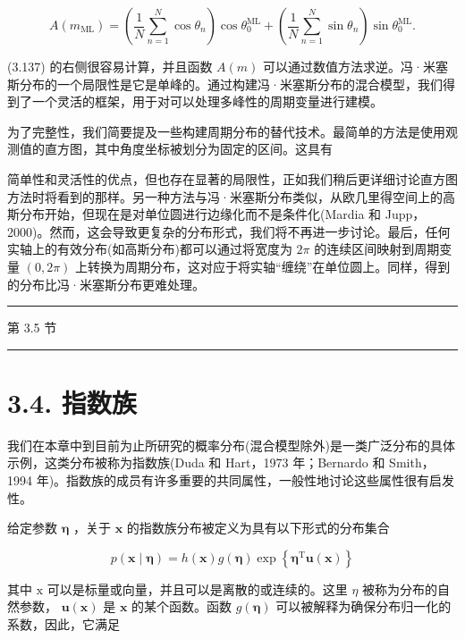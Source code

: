\documentclass[10pt]{report}
\newcommand{\HRule}{\begin{center}\rule{0.9\linewidth}{0.2mm}\end{center}}
\begin{document}
\[
A\left( {m}_{\mathrm{{ML}}}\right)  = \left( {\frac{1}{N}\mathop{\sum }\limits_{{n = 1}}^{N}\cos {\theta }_{n}}\right) \cos {\theta }_{0}^{\mathrm{{ML}}} + \left( {\frac{1}{N}\mathop{\sum }\limits_{{n = 1}}^{N}\sin {\theta }_{n}}\right) \sin {\theta }_{0}^{\mathrm{{ML}}}. \tag{3.137}
\]

(3.137) 的右侧很容易计算，并且函数 \(A\left( m\right)\) 可以通过数值方法求逆。冯·米塞斯分布的一个局限性是它是单峰的。通过构建冯·米塞斯分布的混合模型，我们得到了一个灵活的框架，用于对可以处理多峰性的周期变量进行建模。

为了完整性，我们简要提及一些构建周期分布的替代技术。最简单的方法是使用观测值的直方图，其中角度坐标被划分为固定的区间。这具有

简单性和灵活性的优点，但也存在显著的局限性，正如我们稍后更详细讨论直方图方法时将看到的那样。另一种方法与冯·米塞斯分布类似，从欧几里得空间上的高斯分布开始，但现在是对单位圆进行边缘化而不是条件化(Mardia 和 Jupp，2000)。然而，这会导致更复杂的分布形式，我们将不再进一步讨论。最后，任何实轴上的有效分布(如高斯分布)都可以通过将宽度为 \({2\pi }\) 的连续区间映射到周期变量 \(\left( {0,{2\pi }}\right)\) 上转换为周期分布，这对应于将实轴“缠绕”在单位圆上。同样，得到的分布比冯·米塞斯分布更难处理。

\HRule

第 3.5 节

\HRule

\section*{3.4. 指数族}

我们在本章中到目前为止所研究的概率分布(混合模型除外)是一类广泛分布的具体示例，这类分布被称为指数族(Duda 和 Hart，1973 年；Bernardo 和 Smith，1994 年)。指数族的成员有许多重要的共同属性，一般性地讨论这些属性很有启发性。

给定参数 \(\mathbf{\eta }\) ，关于 \(\mathbf{x}\) 的指数族分布被定义为具有以下形式的分布集合

\[
p\left( {\mathbf{x} \mid  \mathbf{\eta }}\right)  = h\left( \mathbf{x}\right) g\left( \mathbf{\eta }\right) \exp \left\{  {{\mathbf{\eta }}^{\mathrm{T}}\mathbf{u}\left( \mathbf{x}\right) }\right\}   \tag{3.138}
\]

其中 \(\mathrm{x}\) 可以是标量或向量，并且可以是离散的或连续的。这里 \(\eta\) 被称为分布的自然参数， \(\mathbf{u}\left( \mathbf{x}\right)\) 是 \(\mathbf{x}\) 的某个函数。函数 \(g\left( \mathbf{\eta }\right)\) 可以被解释为确保分布归一化的系数，因此，它满足
\end{document}
